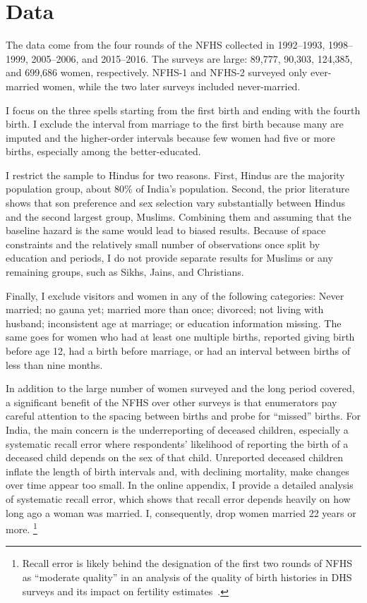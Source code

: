\documentclass[12pt,letterpaper]{article}
\begin{document}
\section{Data\label{sec:data}}

The data come from the four rounds of the NFHS
collected in 1992--1993, 1998--1999, 2005--2006, and 2015--2016.
The surveys are large: 89,777, 90,303, 124,385, and 699,686 women, respectively. 
NFHS-1 and NFHS-2 surveyed only ever-married women, while the two later surveys included 
never-married.

I focus on the three spells starting from the first birth and ending with the 
fourth birth.
I exclude the interval from marriage to the first birth because many are imputed and the
higher-order intervals because few women had five or more births, especially among the 
better-educated.

I restrict the sample to Hindus for two reasons.
First, Hindus are the majority population group, about 80\% of India’s population.
Second, the prior literature shows that son preference and sex selection vary 
substantially between Hindus and the second largest group, Muslims. 
Combining them and assuming that the baseline hazard is the same would lead to biased 
results.
Because of space constraints and the relatively small number of observations once split 
by education and periods, I do not provide separate results for Muslims or any  
remaining groups, such as Sikhs, Jains, and Christians.

Finally, I exclude visitors and women in any of the following categories: Never married; 
no gauna yet; married more than once; divorced; not living with husband; inconsistent age 
at marriage; or education information missing.  
The same goes for women who had at least one multiple births, reported giving birth 
before age 12, had a birth before marriage, or had an interval between births of less than 
nine months. 

In addition to the large number of women surveyed and the long period covered, a significant 
benefit of the NFHS over other surveys is that enumerators pay careful attention to the 
spacing between births and probe for ``missed'' births.
For India, the main concern is the underreporting of deceased children, especially a systematic 
recall error where respondents' likelihood of reporting the birth of a deceased child depends 
on the sex of that child.
Unreported deceased children inflate the length of birth intervals and, with declining mortality, 
make changes over time appear too small.
In the online appendix, I provide a detailed analysis of systematic recall error, which 
shows that recall error depends heavily on how long ago a woman was married. 
I, consequently, drop women married 22 years or more.%
\footnote{
Recall error is likely behind the designation of the first two rounds of NFHS as ``moderate 
quality'' in an analysis of the quality of birth histories in DHS surveys and its impact 
on fertility estimates \citep{Schoumaker2014}.
}
\end{document}
